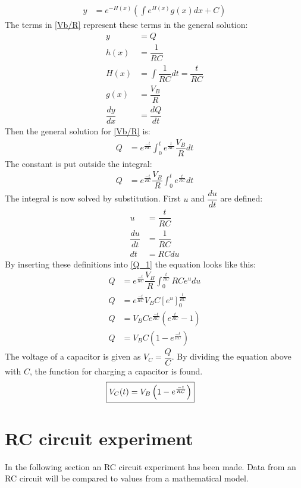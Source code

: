 \begin{align*}
y&=e^{-H(x)}\left(\int e^{H(x)}g(x)dx+C\right)
\end{align*}
The terms in \eqref{Vb/R} represent these terms in the general solution:
\begin{align*}
y &= Q
\\
h(x) &= \dfrac{1}{RC}
\\
H(x) &= \int \dfrac{1}{RC}dt=\dfrac{t}{RC}
\\
g(x) &= \dfrac{V_B}{R}
\\
\dfrac{dy}{dx} &= \dfrac{dQ}{dt}
\end{align*}
Then the general solution for \eqref{Vb/R} is:
\begin{align*}
Q&= e^{\frac{-t}{RC}}\int_{0}^{t}e^{\frac{t}{RC}}\dfrac{V_B}{R}dt
\end{align*}
The constant is put outside the integral:
\begin{align}
Q&= e^{\frac{-t}{RC}}\dfrac{V_B}{R}\int_{0}^{t}e^{\frac{t}{RC}}dt \label{Q_1}
\end{align}
The integral is now solved by substitution. First $u$ and $\dfrac{du}{dt}$ are defined:
\begin{align*}
u &= \dfrac{t}{RC}
\\
\dfrac{du}{dt}&=\dfrac{1}{RC}
\\
dt &=RC du
\end{align*} 
By inserting these definitions into \eqref{Q_1} the equation looks like this:
\begin{align*}
Q&=e^{\frac{-t}{RC}}\dfrac{V_B}{R}\int_{0}^{\frac{t}{RC}}RCe^u du
\\
Q&=e^{\frac{-t}{RC}} V_B C \left[e^u\right]_{0}^{\frac{t}{RC}}
\\
Q&=V_B C e^{\frac{-t}{RC}}\left(e^{\frac{t}{RC}}-1\right)
\\
Q&=V_B C \left(1-e^{\frac{-t}{RC}}\right)
\end{align*} 
The voltage of a capacitor is given as $V_C=\dfrac{Q}{C}$. By dividing the equation above with $C$, the function for charging a capacitor is found.
\begin{align}
\label{V_up}
\Aboxed{
V_C(t)=V_B\left(1-e^{\frac{-t}{RC}}\right)
}
\end{align}
\section{RC circuit experiment}
In the following section an RC circuit experiment has been made. Data from an RC circuit will be compared to values from a mathematical model.
